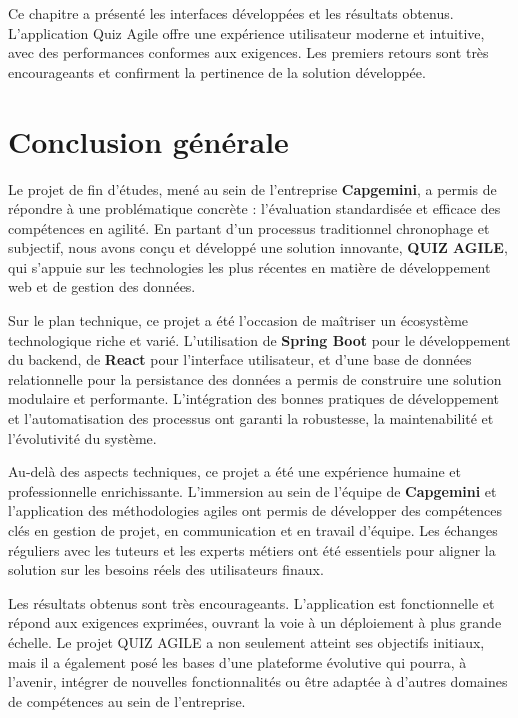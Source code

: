 \documentclass[12pt,a4paper]{report}
\begin{document}
Ce chapitre a présenté les interfaces développées et les résultats obtenus. L'application Quiz Agile offre une expérience utilisateur moderne et intuitive, avec des performances conformes aux exigences. Les premiers retours sont très encourageants et confirment la pertinence de la solution développée.


\cleardoublepage
\chapter*{Conclusion générale}

Le projet de fin d'études, mené au sein de l'entreprise \textbf{Capgemini}, a permis de répondre à une problématique concrète : l'évaluation standardisée et efficace des compétences en agilité. En partant d'un processus traditionnel chronophage et subjectif, nous avons conçu et développé une solution innovante, \textbf{QUIZ AGILE}, qui s'appuie sur les technologies les plus récentes en matière de développement web et de gestion des données.

\medskip
\noindent
Sur le plan technique, ce projet a été l'occasion de maîtriser un écosystème technologique riche et varié. L'utilisation de \textbf{Spring Boot} pour le développement du backend, de \textbf{React} pour l'interface utilisateur, et d'une base de données relationnelle pour la persistance des données a permis de construire une solution modulaire et performante. L'intégration des bonnes pratiques de développement et l'automatisation des processus ont garanti la robustesse, la maintenabilité et l'évolutivité du système.

\medskip
\noindent
Au-delà des aspects techniques, ce projet a été une expérience humaine et professionnelle enrichissante. L'immersion au sein de l'équipe de \textbf{Capgemini} et l'application des méthodologies agiles ont permis de développer des compétences clés en gestion de projet, en communication et en travail d'équipe. Les échanges réguliers avec les tuteurs et les experts métiers ont été essentiels pour aligner la solution sur les besoins réels des utilisateurs finaux.

\medskip
\noindent
Les résultats obtenus sont très encourageants. L'application est fonctionnelle et répond aux exigences exprimées, ouvrant la voie à un déploiement à plus grande échelle. Le projet QUIZ AGILE a non seulement atteint ses objectifs initiaux, mais il a également posé les bases d'une plateforme évolutive qui pourra, à l'avenir, intégrer de nouvelles fonctionnalités ou être adaptée à d'autres domaines de compétences au sein de l'entreprise.
\end{document}
